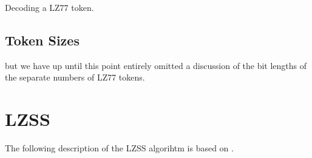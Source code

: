 \begin{algorithm}[H]
  \caption{Decoding a LZ77 token.}
  \label{alg:dec-lzone-token}
\end{algorithm}


\subsection{Token Sizes}

but we have up until this point entirely omitted a discussion of the
bit lengths of the separate numbers of LZ77 tokens.

\section{LZSS}

The following description of the LZSS algorihtm is based on
\cite{Salomon:2004:DCC,mark1996data_compression_book,mcfadden92:_hackin_data_compr_lzss,okumura:_data_compr_algor_larc_lharc}.